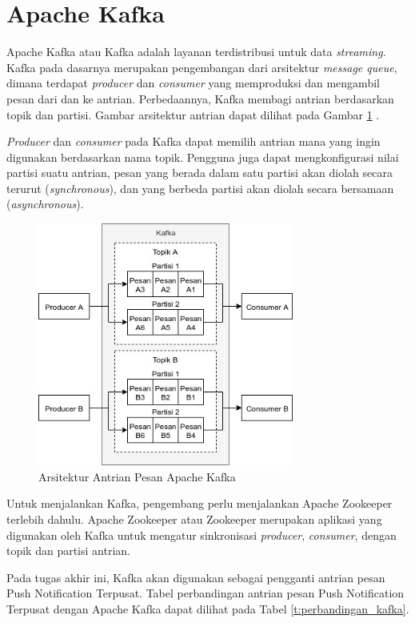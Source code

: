 \section{Apache Kafka}
\par Apache Kafka atau Kafka adalah layanan terdistribusi untuk data \textit{streaming}. Kafka pada dasarnya merupakan pengembangan dari arsitektur \textit{message queue}, dimana terdapat \textit{producer} dan \textit{consumer} yang memproduksi dan mengambil pesan dari dan ke antrian. Perbedaannya, Kafka membagi antrian berdasarkan topik dan partisi. Gambar arsitektur antrian dapat dilihat pada Gambar \ref{img:arsitektur-mq_kafka} \cite{kafka-online}.
\par \textit{Producer} dan \textit{consumer} pada Kafka dapat memilih antrian mana yang ingin digunakan berdasarkan nama topik. Pengguna juga dapat mengkonfigurasi nilai partisi suatu antrian, pesan yang berada dalam satu partisi akan diolah secara terurut (\textit{synchronous}), dan yang berbeda partisi akan diolah secara bersamaan (\textit{asynchronous}).
\clearpage
\begin{figure}[H]
	\centering\includegraphics[width=0.75\textwidth]{bab2/img/arsitektur-mq_kafka.jpg}
	\caption{Arsitektur Antrian Pesan Apache Kafka}
	\label{img:arsitektur-mq_kafka}
\end{figure}
\par Untuk menjalankan Kafka, pengembang perlu menjalankan Apache Zookeeper terlebih dahulu. Apache Zookeeper atau Zookeeper merupakan aplikasi yang digunakan oleh Kafka untuk mengatur sinkronisasi \textit{producer}, \textit{consumer}, dengan topik dan partisi antrian.
\par Pada tugas akhir ini, Kafka akan digunakan sebagai pengganti antrian pesan Push Notification Terpusat. Tabel perbandingan antrian pesan Push Notification Terpusat dengan Apache Kafka dapat dilihat pada Tabel \ref{t:perbandingan_kafka}.
